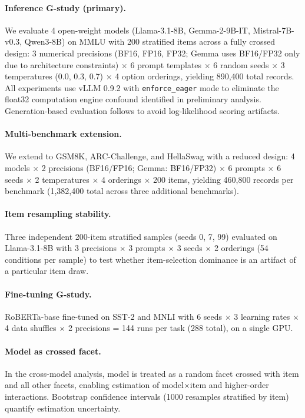 \documentclass[11pt,letterpaper]{article}
\begin{document}
\paragraph{Inference G-study (primary).}
We evaluate 4 open-weight models (Llama-3.1-8B, Gemma-2-9B-IT, Mistral-7B-v0.3, Qwen3-8B) on MMLU with 200 stratified items across a fully crossed design: 3 numerical precisions (BF16, FP16, FP32; Gemma uses BF16/FP32 only due to architecture constraints) $\times$ 6 prompt templates $\times$ 6 random seeds $\times$ 3 temperatures (0.0, 0.3, 0.7) $\times$ 4 option orderings, yielding 890,400 total records.
All experiments use vLLM 0.9.2 with \texttt{enforce\_eager} mode to eliminate the float32 computation engine confound identified in preliminary analysis.
Generation-based evaluation follows \citet{hua2025generation} to avoid log-likelihood scoring artifacts.

\paragraph{Multi-benchmark extension.}
We extend to GSM8K, ARC-Challenge, and HellaSwag with a reduced design: 4 models $\times$ 2 precisions (BF16/FP16; Gemma: BF16/FP32) $\times$ 6 prompts $\times$ 6 seeds $\times$ 2 temperatures $\times$ 4 orderings $\times$ 200 items, yielding 460,800 records per benchmark (1,382,400 total across three additional benchmarks).

\paragraph{Item resampling stability.}
Three independent 200-item stratified samples (seeds 0, 7, 99) evaluated on Llama-3.1-8B with 3 precisions $\times$ 3 prompts $\times$ 3 seeds $\times$ 2 orderings (54 conditions per sample) to test whether item-selection dominance is an artifact of a particular item draw.

\paragraph{Fine-tuning G-study.}
RoBERTa-base fine-tuned on SST-2 and MNLI with 6 seeds $\times$ 3 learning rates $\times$ 4 data shuffles $\times$ 2 precisions = 144 runs per task (288 total), on a single GPU.

\paragraph{Model as crossed facet.}
In the cross-model analysis, model is treated as a random facet crossed with item and all other facets, enabling estimation of model$\times$item and higher-order interactions.
Bootstrap confidence intervals (1000 resamples stratified by item) quantify estimation uncertainty.
\end{document}
